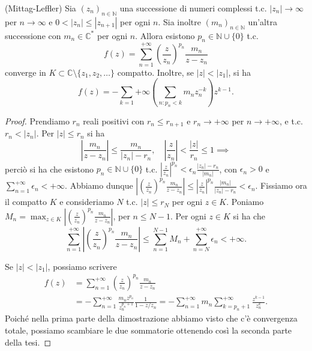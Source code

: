 \begin{lm} \label{mittagleffler}
  (Mittag-Leffler) Sia $(z_n)_{n \in \mathbb{N}}$ una successione di numeri complessi t.c. $|z_n| \longrightarrow \infty$ per $n \longrightarrow \infty$ e $0<|z_n| \le |z_{n+1}|$ per ogni $n$. Sia inoltre $(m_n)_{n \in \mathbb{N}}$ un'altra successione con $m_n \in \mathbb{C}^*$ per ogni $n$. Allora esistono $p_n \in \mathbb{N}\cup \{0\}$ t.c.
  $$f(z)=\sum_{n=1}^{+\infty} \left(\frac{z}{z_n}\right)^{p_n}\frac{m_n}{z-z_n}$$
  converge in $K \subset \mathbb{C}\setminus\{z_1, z_2, \dots\}$ compatto. Inoltre, se $|z|<|z_1|$, si ha
  $$f(z)=-\sum_{k=1}{+\infty} \left(\sum_{n:p_n<k}m_nz_n^{-k}\right)z^{k-1}.$$
\end{lm}

\begin{proof}
  Prendiamo $r_n$ reali positivi con $r_n \le r_{n+1}$ e $r_n \longrightarrow +\infty$ per $n \longrightarrow +\infty$, e t.c. $r_n<|z_n|$. Per $|z| \le r_n$ si ha
  $$\left|\frac{m_n}{z-z_n}\right| \le \frac{m_n}{|z_n|-r_n}, \quad \left|\frac{z}{z_n}\right|<\frac{|z|}{r_n} \le 1 \implies$$
  perciò si ha che esistono $p_n \in \mathbb{N}\cup\{0\}$ t.c. $\displaystyle \left|\frac{z}{z_n}\right|^{p_n} <\epsilon_n \frac{|z_n|-r_n}{|m_n|}$, con $\epsilon_n>0$ e $\displaystyle \sum_{n=1}^{+\infty} \epsilon_n<+\infty$.
  Abbiamo dunque $\displaystyle \left|\left(\frac{z}{z_n}\right)^{p_n}\frac{m_n}{z-z_n}\right| \le \left|\frac{z}{z_n}\right|^{p_n} \frac{|m_n|}{|z_n|-r_n}<\epsilon_n$. Fissiamo ora il compatto $K$ e consideriamo $N$ t.c. $|z| \le r_N$ per ogni $z \in K$.
  Poniamo $\displaystyle M_n=\max_{z \in K} \left|\left(\frac{z}{z_n}\right)^{p_n}\frac{m_n}{z-z_n}\right|$, per $n \le N-1$. Per ogni $z \in K$ si ha che
  $$\sum_{n=1}^{+\infty} \left|\left(\frac{z}{z_n}\right)^{p_n}\frac{m_n}{z-z_n}\right| \le \sum_{n=1}^{N-1} M_n+\sum_{n=N}^{+\infty} \epsilon_n<+\infty.$$

  Se $|z|<|z_1|$, possiamo scrivere
  \begin{align*}
    f(z) & =\sum_{n=1}^{+\infty} \left(\frac{z}{z_n}\right)^{p_n}\frac{m_n}{z-z_n} \\
    & =-\sum_{n=1}^{+\infty} \frac{m_nz^{p_n}}{z_n^{p_n+1}}\frac{1}{1-z/z_n}=-\sum_{n=1}^{+\infty}m_n\sum_{k=p_n+1}^{+\infty} \frac{z^{k-1}}{z_n^k}.
  \end{align*}
  Poiché nella prima parte della dimostrazione abbiamo visto che c'è convergenza totale, possiamo scambiare le due sommatorie ottenendo così la seconda parte della tesi.
\end{proof}

